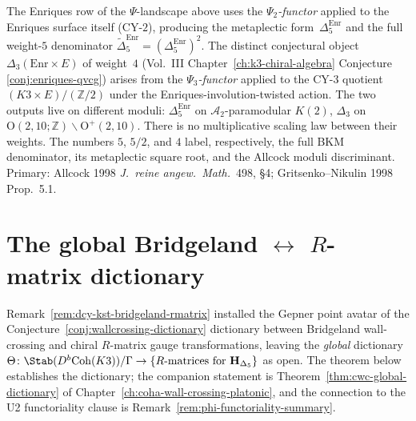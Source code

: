 \begin{remark}
\label{rem:dcy-enriques-cy2-vs-cy3}
The Enriques row of the $\Psi$-landscape above uses the
\emph{$\Psi_2$-functor} applied to the Enriques surface itself
(CY-$2$), producing the metaplectic form~$\Delta_5^{\mathrm{Enr}}$
and the full weight-$5$ denominator
\(\widetilde\Delta_5^{\mathrm{Enr}}=(\Delta_5^{\mathrm{Enr}})^2\).
The distinct conjectural object
$\Delta_3(\mathrm{Enr}\times E)$ of weight~$4$
(Vol.~III Chapter~\ref{ch:k3-chiral-algebra} Conjecture
\ref{conj:enriques-qvcg}) arises from the \emph{$\Psi_3$-functor}
applied to the CY-$3$ quotient $(K3\times E)/(\mathbb{Z}/2)$
under the Enriques-involution-twisted action. The two outputs
live on different moduli: $\Delta_5^{\mathrm{Enr}}$ on
$\mathcal{A}_2$-paramodular $K(2)$, $\Delta_3$ on
$\mathrm{O}(2,10;\mathbb{Z})\backslash\mathrm{O}^+(2,10)$.
There is no multiplicative scaling law between their weights. The
numbers \(5\), \(5/2\), and \(4\) label, respectively, the full BKM
denominator, its metaplectic square root, and the Allcock moduli
discriminant. Primary: Allcock 1998 \emph{J.~reine angew.~Math.}~498,
\S 4; Gritsenko--Nikulin 1998 Prop.~5.1.
\end{remark}

\section{The global Bridgeland \texorpdfstring{$\leftrightarrow$}{<->} \texorpdfstring{$R$}{R}-matrix dictionary}
\label{sec:dcy-global-bridgeland-dictionary}

Remark~\ref{rem:dcy-kst-bridgeland-rmatrix} installed the Gepner
point avatar of the Conjecture~\ref{conj:wallcrossing-dictionary}
dictionary between Bridgeland wall-crossing and chiral $R$-matrix
gauge transformations, leaving the \emph{global} dictionary
$\Theta\colon\Stab(D^b\mathrm{Coh}(K3))/\Gamma\to
\{R\text{-matrices for }\mathbf{H}_{\Delta_5}\}$ as open. The
theorem below establishes the dictionary; the companion
statement is Theorem~\ref{thm:cwc-global-dictionary} of
Chapter~\ref{ch:coha-wall-crossing-platonic}, and the connection to
the U2 functoriality clause is Remark~\ref{rem:phi-functoriality-summary}.

